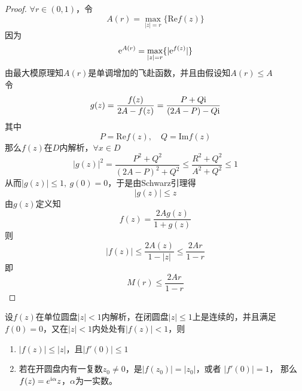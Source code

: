 \begin{proof}
    
    $\forall r \in (0,1)$，令
    $$A(r) = \max_{|z|=r}\{\mathrm{Re}f(z)\}$$
    因为
    $$\mathrm{e}^{A(r)} = \max_{|z|=r}\{|\mathrm{e}^{f(z)}|\}$$
    由最大模原理知$A(r)$是单调增加的飞赴函数，并且由假设知$A(r) \leq A$\\
    令
    $$ g(z) = \dfrac{f(z)}{2A - f(z)} = \dfrac{P + Q\mathrm{i}}{(2A-P)-Q\mathrm{i}} $$
    其中
    $$ P = \mathrm{Re}f(z),\quad Q = \mathrm{Im}f(z) $$
    那么$f(z)$在$D$内解析，$\forall x\in D$
    $$|g(z)|^2 = \dfrac{P^2 + Q^2}{(2A-P)^2 + Q^2} \leq \dfrac{R^2 + Q^2}{A^2 + Q^2} \leq 1$$
    从而$|g(z)| \leq 1,\ g(0) = 0$，于是由\textup{Schwarz}引理得
    $$|g(z) | \leq z$$
    由$g(z)$定义知
    $$f(z) = \dfrac{2Ag(z)}{1 + g(z)}$$
    则
    $$ |f(z)| \leq \dfrac{2A(z)}{1-|z|} \leq \dfrac{2Ar}{1-r}$$
    即
    $$M(r) \leq \dfrac{2Ar}{1-r}$$

\end{proof}

\begin{lemma}[Schwarz引理]
    
    设$f(z)$在单位圆盘$|z|<1$内解析，在闭圆盘$|z| \leq 1$上是连续的，并且满足$f(0) = 0$，又在$|z| < 1$内处处有$|f(z)| < 1$，则

    \begin{enumerate}
        
        \item $|f(z)| \leq |z|$，且$|f'(0)| \leq 1$
            
        \item 
            若在开圆盘内有一复数$z_0 \neq 0$，是$|f(z_0)| = |z_0|$，或者 $|f'(0)| = 1$，
            那么$f(z) = e^{\mathrm{i}\alpha}z$，$\alpha$为一实数。
        
    \end{enumerate}

\end{lemma}

